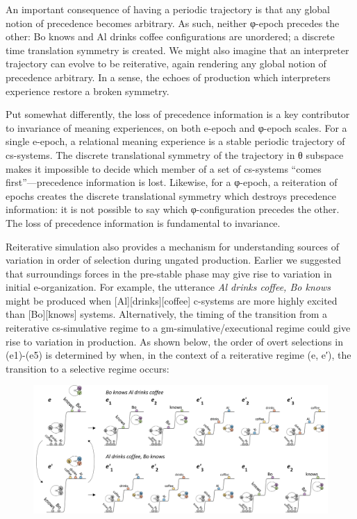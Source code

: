   An important consequence of having a periodic trajectory is that any global notion of precedence becomes arbitrary. As such, neither φ-epoch precedes the other: {\textbar}Bo knows{\textbar} and {\textbar}Al drinks coffee{\textbar} configurations are unordered; a discrete time translation symmetry is created. We might also imagine that an interpreter trajectory can evolve to be reiterative, again rendering any global notion of precedence arbitrary. In a sense, the echoes of production which interpreters experience restore a broken symmetry. 

  Put somewhat differently, the loss of precedence information is a key contributor to invariance of meaning experiences, on both e-epoch and φ-epoch scales. For a single e-epoch, a relational meaning experience is a stable periodic trajectory of cs-systems. The discrete translational symmetry of the trajectory in θ subspace makes it impossible to decide which member of a set of cs-systems “comes first”—precedence information is lost. Likewise, for a φ-epoch, a reiteration of epochs creates the discrete translational symmetry which destroys precedence information: it is not possible to say which φ-configuration precedes the other. The loss of precedence information is fundamental to invariance. 

  Reiterative simulation also provides a mechanism for understanding sources of variation in order of selection during ungated production. Earlier we suggested that surroundings forces in the pre-stable phase may give rise to variation in initial e-organization. For example, the utterance \textit{Al drinks coffee, Bo knows} might be produced when [Al][drinks][coffee] c-systems are more highly excited than [Bo][knows] systems. Alternatively, the timing of the transition from a reiterative cs-simulative regime to a gm-simulative/executional regime could give rise to variation in production. As shown below, the order of overt selections in (e1)-(e5) is determined by when, in the context of a reiterative regime (e, e′), the transition to a selective regime occurs:

  
\begin{figure}
\includegraphics[width=\textwidth]{figures/Tilsen-img116.png}
\caption{\missingcaption}
\label{fig:}
\end{figure}
 

